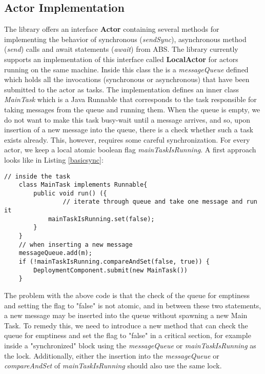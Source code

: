 \subsection{Actor Implementation}
The library offers an interface \textbf{Actor} containing several methods for implementing the behavior of synchronous (\textit{sendSync}), asynchronous method (\textit{send}) calls and await statements (\textit{await}) from ABS. The library currently supports an implementation of this interface called \textbf{LocalActor} for actors running on the same machine. Inside this class the is a \textit{messageQueue} defined which holds all the invocations (synchronous or asynchronous) that have been submitted to the actor as tasks. The implementation defines an inner class \textit{MainTask} which is a Java Runnable that corresponds to the task responsible for taking messages from the queue and running them. When the queue is empty, we do not want to make this task busy-wait until a message arrives, and so, upon insertion of a new message into the queue, there is a check whether such a task exists already. This, however, requires some careful synchronization. For every actor, we keep a local atomic boolean flag \textit{mainTaskIsRunning}. A first approach looks like in Listing \ref{basicsync}:

\begin{lstlisting}[caption= Basic Synchronization for the Demand-Driven Approach, label=basicsync]
	// inside the task
	class MainTask implements Runnable{
		public void run() ({
				// iterate through queue and take one message and run it
			mainTaskIsRunning.set(false);
		}
	}
	// when inserting a new message
	messageQueue.add(m);
	if (!mainTaskIsRunning.compareAndSet(false, true)) {
		DeploymentComponent.submit(new MainTask())
	}
\end{lstlisting}

The problem with the above code is that the check of the queue for emptiness and setting the flag to "false" is not atomic, and in between these two statements, a new message may be inserted into the queue without spawning a new Main Task. To remedy this, we need to introduce a new method that can check the queue for emptiness and set the flag to "false" in a critical section, for example inside a "synchronized" block using the \textit{messageQueue} or \textit{mainTaskIsRunning} as the lock. Additionally, either the insertion into the \textit{messageQueue} or \textit{compareAndSet} of \textit{mainTaskIsRunning} should also use the same lock.

